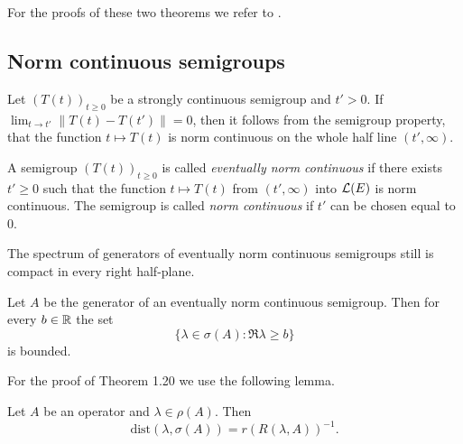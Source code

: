 For the proofs of these two theorems we refer to \citet[Chapter 3, Theorem 4.7 and 4.8]{pazy:1983}.

\subsection{Norm continuous semigroups} \label{subsec:a2-1.se6}%
Let $(T(t))_{t\geq 0}$ be a strongly continuous semigroup and $t' > 0$.
If $\lim_{t \to t'} \|T(t) - T(t')\| = 0$, then it follows from the semigroup property, that the function $t \mapsto T(t)$ is norm continuous on the whole half line $(t',\infty)$.

\begin{definition}\label{def:a2-1.19}
A semigroup $(T(t))_{t\geq 0}$ is called \emph{eventually norm continuous} if there exists $t' \geq 0$ such that the function $t \mapsto T(t)$ from $(t',\infty)$ into $\mathcal{L}(E)$ is norm continuous.
The semigroup is called \emph{norm continuous} if $t'$ can be chosen equal to $0$.
\end{definition}

The spectrum of generators of eventually norm continuous semigroups still is compact in every right half-plane.

\begin{theorem}\label{thm:a2-1.20}
Let $A$ be the generator of an eventually norm continuous semigroup.
Then for every $b \in \mathbb{R}$ the set
\[
    \{\lambda \in \sigma(A) \colon \Re\lambda \geq b\}
\]
is bounded.
\end{theorem}
For the proof of Theorem 1.20 we use the following lemma.
\begin{lemma}\label{lem:a2-1.21}
Let $A$ be an operator and $\lambda \in \rho(A)$.
Then
\[
    \text{dist}(\lambda,\sigma(A)) = r(R(\lambda,A))^{-1}.
\]
\end{lemma}

